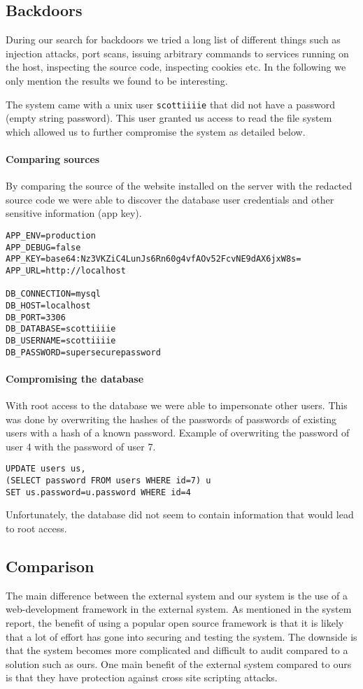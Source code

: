 \documentclass{article}
\begin{document}
\subsection{Backdoors}
During our search for backdoors we tried a long list of different things such as injection attacks, port scans, 
issuing arbitrary commands to services running on the host, inspecting the source code, inspecting cookies etc. 
In the following we only mention the results we found to be interesting.

The system came with a unix user \texttt{scottiiiie} that did not have a password (empty string password).
This user granted us access to read the file system which allowed us to further compromise the system as detailed below.

\paragraph{Comparing sources}
By comparing the source of the website installed on the server with the redacted source code we were able to discover the database user credentials and other sensitive information (app key).
\begin{verbatim}
APP_ENV=production
APP_DEBUG=false
APP_KEY=base64:Nz3VKZiC4LunJs6Rn60g4vfAOv52FcvNE9dAX6jxW8s=
APP_URL=http://localhost

DB_CONNECTION=mysql
DB_HOST=localhost
DB_PORT=3306
DB_DATABASE=scottiiiie
DB_USERNAME=scottiiiie
DB_PASSWORD=supersecurepassword
\end{verbatim}

\paragraph{Compromising the database}
With root access to the database we were able to impersonate other users.
This was done by overwriting the hashes of the passwords of passwords of existing users with a hash of a known password.
Example of overwriting the password of user 4 with the password of user 7.
\begin{verbatim}
UPDATE users us,
(SELECT password FROM users WHERE id=7) u 
SET us.password=u.password WHERE id=4
\end{verbatim}
Unfortunately, the database did not seem to contain information that would lead to root access.

\subsection{Comparison}
The main difference between the external system and our system is the use of a web-development framework in the external system.
As mentioned in the system report, the benefit of using a popular open source framework is that it is likely that a lot of effort has gone into securing and testing the system.  
The downside is that the system becomes more complicated and difficult to audit compared to a solution such as ours.
One main benefit of the external system compared to ours is that they have protection against cross site scripting attacks.
\end{document}
